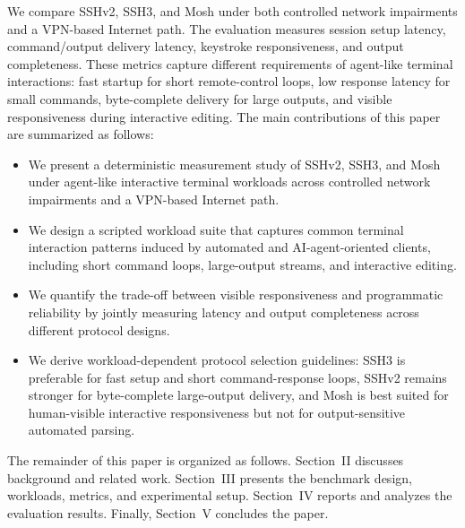 We compare SSHv2, SSH3, and Mosh under both controlled network impairments and a VPN-based Internet path. The evaluation measures session setup latency, command/output delivery latency, keystroke responsiveness, and output completeness. These metrics capture different requirements of agent-like terminal interactions: fast startup for short remote-control loops, low response latency for small commands, byte-complete delivery for large outputs, and visible responsiveness during interactive editing. The main contributions of this paper are summarized as follows:
\begin{itemize}
    \item We present a deterministic measurement study of SSHv2, SSH3, and Mosh under agent-like interactive terminal workloads across controlled network impairments and a VPN-based Internet path.

    \item We design a scripted workload suite that captures common terminal interaction patterns induced by automated and AI-agent-oriented clients, including short command loops, large-output streams, and interactive editing.

    \item We quantify the trade-off between visible responsiveness and programmatic reliability by jointly measuring latency and output completeness across different protocol designs.

    \item We derive workload-dependent protocol selection guidelines: SSH3 is preferable for fast setup and short command-response loops, SSHv2 remains stronger for byte-complete large-output delivery, and Mosh is best suited for human-visible interactive responsiveness but not for output-sensitive automated parsing.
\end{itemize}

The remainder of this paper is organized as follows. Section~II discusses background and related work. Section~III presents the benchmark design, workloads, metrics, and experimental setup. Section~IV reports and analyzes the evaluation results. Finally, Section~V concludes the paper.

